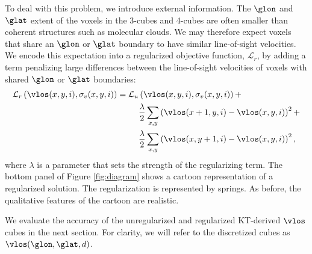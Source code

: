 To deal with this problem, we introduce external information.
The $\glon$ and $\glat$ extent of the voxels in the 3-cubes and 4-cubes are often smaller than coherent structures such as molecular clouds. 
We may therefore expect voxels that share an $\glon$ or $\glat$ boundary to have similar line-of-sight velocities.
We encode this expectation into a regularized objective function, $\mathcal{L}_r$, by adding a term penalizing large differences between the line-of-sight velocities of voxels with shared $\glon$ or $\glat$ boundaries:
\begin{equation}
  \label{eqn:obj_reg}
  \begin{split}
  \mathcal{L}_r\left(\vlos(x, y, i), \sigma_v(x, y, i) \right) = 
  \mathcal{L}_u & \left(\vlos(x, y, i), \sigma_v(x, y, i) \right) + \\
  & \frac{\lambda}{2} \sum_{x, y} \left( \vlos(x + 1, y, i) - \vlos(x, y, i) \right)^2 +\\
  & \frac{\lambda}{2} \sum_{x, y} \left( \vlos(x, y + 1, i) - \vlos(x, y, i) \right)^2,
  \end{split}
\end{equation}
where $\lambda$ is a parameter that sets the strength of the regularizing term. 
The bottom panel of Figure \ref{fig:diagram} shows a cartoon representation of a regularized solution. 
The regularization is represented by springs. 
As before, the qualitative features of the cartoon are realistic. 

We evaluate the accuracy of the unregularized and regularized KT-derived $\vlos$ cubes in the next section. 
For clarity, we will refer to the discretized cubes as $\vlos(\glon, \glat, d)$. 
